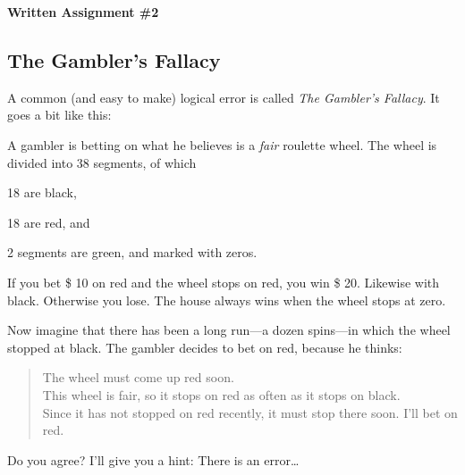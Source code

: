 \documentclass[12pt,letterpaper]{article}
\begin{document}
\setlength{\parskip}{1ex plus 0.5ex minus 0.2ex}
\setlength{\parindent}{0pt}

\pagestyle{fancy}
\lfoot{}
\rfoot{}

\begin{center}
{
\Large
\textbf{Written Assignment \#2}
}
\end{center}

\subsection*{The Gambler's Fallacy} A common (and easy to make) logical error is called \emph{The Gambler's Fallacy}. It goes a bit like this:

A gambler is betting on what he believes is a \emph{fair} roulette wheel. The wheel is divided into 38 segments, of which 
\begin{compactitem}
\item 18 are black,
\item 18 are red, and
\item 2 segments are green, and marked with zeros.
\end{compactitem}

If you bet \$ 10 on red and the wheel stops on red, you win \$ 20. Likewise with black. Otherwise you lose. The house always wins when the wheel stops at zero.

Now imagine that there has been a long run---a dozen spins---in which the wheel stopped at black. The gambler decides to bet on red, because he thinks:

\begin{quote} The wheel must come up red soon.\\
This wheel is fair, so it stops on red as often as it stops on black.\\
Since it has not stopped on red recently, it must stop there soon. I'll bet on red.
\end{quote}

Do you agree? I'll give you a hint: There is an error\dots \\
\end{document}
